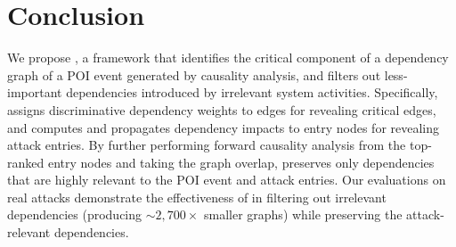 \section{Conclusion}
We propose \tool, a framework that identifies the critical component of 
a dependency graph of a POI event generated by causality analysis, and filters out less-important dependencies introduced by irrelevant system activities.
%
Specifically, \tool assigns discriminative dependency weights to edges for revealing critical edges, and computes and propagates dependency impacts to entry nodes for revealing attack entries. 
By further performing forward causality analysis from the top-ranked entry nodes and taking the graph overlap, \tool preserves only dependencies that are highly relevant to the POI event and attack entries.
Our evaluations on real attacks demonstrate the effectiveness of \tool in filtering out irrelevant dependencies (producing $\sim2,700\times$ smaller graphs) while preserving the attack-relevant dependencies.



